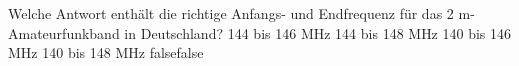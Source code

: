     {Welche Antwort enthält die richtige Anfangs- und Endfrequenz für das 2 m-Amateurfunkband in Deutschland?}
    {144 bis 146 MHz}
    {144 bis 148 MHz}
    {140 bis 146 MHz}
    {140 bis 148 MHz}
    {false}{false}